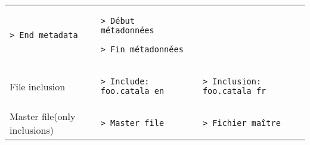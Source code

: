 \documentclass[a3paper,landscape]{article}
\begin{document}
\begin{multicols*}{2}
\begin{center}
\begin{tabular}{p{}p{}p{}}
\begin{verbatim}
> End metadata
\end{verbatim}
\vspace*{-1.75em}
&
\vspace*{-1.75em}
\begin{verbatim}
> Début métadonnées

> Fin métadonnées
\end{verbatim}
\vspace*{-1.75em}
\\
File inclusion&
\vspace*{-1.75em}
\begin{verbatim}
> Include: foo.catala_en
\end{verbatim}
\vspace*{-1.75em}
&
\vspace*{-1.75em}
\begin{verbatim}
> Inclusion: foo.catala_fr
\end{verbatim}
\vspace*{-1.75em}
\\
Master file\newline (only inclusions)&
\vspace*{-1.75em}
\begin{verbatim}
> Master file
\end{verbatim}
\vspace*{-1.75em}
&
\vspace*{-1.75em}
\begin{verbatim}
> Fichier maître
\end{verbatim}
\vspace*{-1.75em}
\\
\bottomrule
\end{tabular}
\end{center}
\newcommand*\FancyVerbStartString{```catala}
\newcommand*\FancyVerbStopString{```}















\end{multicols*}
\end{document}
